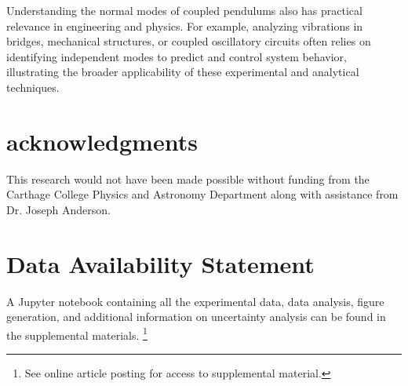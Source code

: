 \documentclass[rc]{physicsinprogress}
\begin{document}
Understanding the normal modes of coupled pendulums also has practical relevance in engineering and physics. For example, analyzing vibrations in bridges, mechanical structures, or coupled oscillatory circuits often relies on identifying independent modes to predict and control system behavior, illustrating the broader applicability of these experimental and analytical techniques.

\section*{acknowledgments}
This research would not have been made possible without funding from the Carthage College Physics and Astronomy Department along with assistance from Dr. Joseph Anderson.

\vspace{\fill}

\section*{Data Availability Statement}
A Jupyter notebook containing all the experimental data, data analysis, figure generation, and additional information on uncertainty analysis can be found in the supplemental materials. \footnote{See online article posting for access to supplemental material.}



\end{document}
